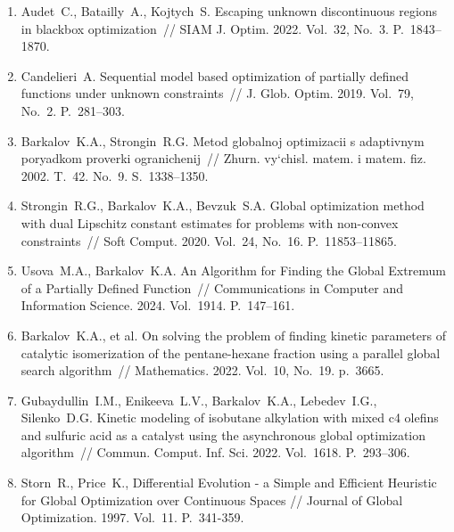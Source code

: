 \documentclass[a4paper,12pt,russian]{article}
\begin{document}
\begin{enumerate}
\item \label{rfa:enlit:Audet2022}
Audet~C., Batailly~A., Kojtych~S. Escaping unknown discontinuous regions in blackbox optimization~// SIAM J. Optim. 2022. Vol.~32, No.~3. P.~1843--1870. %

\item \label{rfa:enlit:Candelieri2019}
Candelieri~A. Sequential model based optimization of partially defined functions
under unknown constraints~// J. Glob. Optim. 2019. Vol.~79, No.~2. P.~281--303. %

\item \label{rfa:enlit:Sergeyev2003}
Barkalov~K.A., Strongin~R.G. Metod globalnoj optimizacii s adaptivnym poryadkom proverki ogranichenij~// Zhurn. vy`chisl. matem. i matem. fiz. 2002. T.~42. No.~9. S.~1338--1350.

\item \label{rfa:enlit:Strongin2020}
Strongin~R.G., Barkalov~K.A., Bevzuk~S.A. Global optimization method with dual Lipschitz constant estimates for problems with non-convex constraints~// 
Soft Comput. 2020. Vol.~24, No.~16. P.~11853--11865. %

\item \label{rfa:enlit:Usova2024}
Usova~M.A., Barkalov~K.A. An Algorithm for Finding the Global Extremum of a Partially Defined Function~// Communications in Computer and Information Science. 2024. Vol.~1914. P.~147--161. %

\item \label{rfa:enlit:Barkalov2022}
Barkalov~K.A., et al. On solving the problem of finding kinetic parameters of catalytic isomerization of the pentane-hexane fraction using a parallel global search algorithm~// 
Mathematics. 2022. Vol.~10, No.~19. p.~3665. %

\item \label{rfa:enlit:Gubaydullin2022}
Gubaydullin~I.M., Enikeeva~L.V., Barkalov~K.A., Lebedev~I.G., Silenko~D.G. Kinetic modeling of isobutane alkylation with mixed c4 olefins and sulfuric acid as a catalyst using the asynchronous global optimization algorithm~// Commun. Comput. Inf. Sci. 2022. Vol.~1618. P.~293--306. %

\item \label{rfa:enlit:differential_evolution}
Storn~R., Price~K., Differential Evolution - a Simple and Efficient Heuristic for Global Optimization over Continuous Spaces // Journal of Global Optimization. 1997. Vol.~11. P.~341-359.


\end{enumerate}
\end{document}
